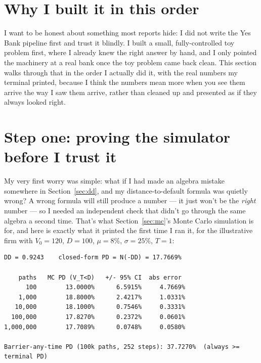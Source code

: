 \section{Why I built it in this order}

I want to be honest about something most reports hide: I did not write the Yes Bank pipeline first and trust it blindly. I built a small, fully-controlled toy problem first, where I already knew the right answer by hand, and I only pointed the machinery at a real bank once the toy problem came back clean. This section walks through that in the order I actually did it, with the real numbers my terminal printed, because I think the numbers mean more when you see them arrive the way I saw them arrive, rather than cleaned up and presented as if they always looked right.

\section{Step one: proving the simulator before I trust it}
\label{sec:build-mc}

My very first worry was simple: what if I had made an algebra mistake somewhere in Section~\ref{sec:dd}, and my distance-to-default formula was quietly wrong? A wrong formula will still produce a number — it just won't be the \emph{right} number — so I needed an independent check that didn't go through the same algebra a second time. That's what Section~\ref{sec:mc}'s Monte Carlo simulation is for, and here is exactly what it printed the first time I ran it, for the illustrative firm with $V_0=120$, $D=100$, $\mu=8\%$, $\sigma=25\%$, $T=1$:

\begin{verbatim}
DD = 0.9243    closed-form PD = N(-DD) = 17.7669%

    paths   MC PD (V_T<D)   +/- 95% CI  abs error
      100        13.0000%      6.5915%     4.7669%
    1,000        18.8000%      2.4217%     1.0331%
   10,000        18.1000%      0.7546%     0.3331%
  100,000        17.8270%      0.2372%     0.0601%
1,000,000        17.7089%      0.0748%     0.0580%

Barrier-any-time PD (100k paths, 252 steps): 37.7270%  (always >= terminal PD)
\end{verbatim}

